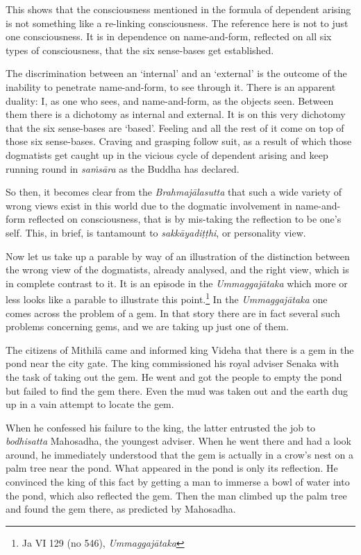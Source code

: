 This shows that the consciousness mentioned in the formula of dependent arising is not something like a re-linking consciousness. The reference here is not to just one consciousness. It is in dependence on name-and-form, reflected on all six types of consciousness, that the six sense-bases get established.

The discrimination between an `internal' and an `external' is the outcome of the inability to penetrate name-and-form, to see through it. There is an apparent duality: I, as one who sees, and name-and-form, as the objects seen. Between them there is a dichotomy as internal and external. It is on this very dichotomy that the six sense-bases are `based'. Feeling and all the rest of it come on top of those six sense-bases. Craving and grasping follow suit, as a result of which those dogmatists get caught up in the vicious cycle of dependent arising and keep running round in \emph{saṁsāra} as the Buddha has declared.

So then, it becomes clear from the \emph{Brahmajālasutta} that such a wide variety of wrong views exist in this world due to the dogmatic involvement in name-and-form reflected on consciousness, that is by mis-taking the reflection to be one's self. This, in brief, is tantamount to \emph{sakkāyadiṭṭhi}, or personality view.

Now let us take up a parable by way of an illustration of the distinction between the wrong view of the dogmatists, already analysed, and the right view, which is in complete contrast to it. It is an episode in the \emph{Ummaggajātaka} which more or less looks like a parable to illustrate this point.\footnote{Ja VI 129 (no 546), \emph{Ummaggajātaka}} In the \emph{Ummaggajātaka} one comes across the problem of a gem. In that story there are in fact several such problems concerning gems, and we are taking up just one of them.

The citizens of Mithilā came and informed king Videha that there is a gem in the pond near the city gate. The king commissioned his royal adviser Senaka with the task of taking out the gem. He went and got the people to empty the pond but failed to find the gem there. Even the mud was taken out and the earth dug up in a vain attempt to locate the gem.

When he confessed his failure to the king, the latter entrusted the job to \emph{bodhisatta} Mahosadha, the youngest adviser. When he went there and had a look around, he immediately understood that the gem is actually in a crow's nest on a palm tree near the pond. What appeared in the pond is only its reflection. He convinced the king of this fact by getting a man to immerse a bowl of water into the pond, which also reflected the gem. Then the man climbed up the palm tree and found the gem there, as predicted by Mahosadha.

